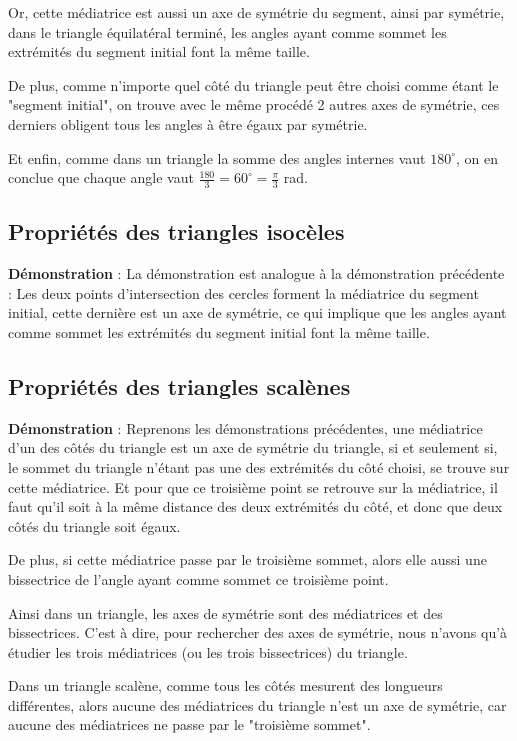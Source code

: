 \documentclass[a4paper, twoside]{article}
\begin{document}
Or, cette médiatrice est aussi un axe de symétrie du segment,
ainsi par symétrie, dans le triangle équilatéral terminé,
les angles ayant comme sommet les extrémités du segment initial font la même taille.

De plus, comme n'importe quel côté du triangle peut être choisi comme étant le "segment initial",
on trouve avec le même procédé 2 autres axes de symétrie,
ces derniers obligent tous les angles à être égaux par symétrie.

Et enfin, comme dans un triangle la somme des angles internes vaut $180^\circ$,
on en conclue que chaque angle vaut $\frac{180}{3} = 60^\circ = \frac{\pi}{3}$ rad.

\subsection*{Propriétés des triangles isocèles} \label{propriete_triangle_isocele}

\textbf{Démonstration} : La démonstration est analogue à la démonstration précédente :
Les deux points d'intersection des cercles forment la médiatrice du segment initial,
cette dernière est un axe de symétrie,
ce qui implique que les angles ayant comme sommet les extrémités du segment initial font la même taille.

\subsection*{Propriétés des triangles scalènes} \label{propriete_triangle_scalene}

\textbf{Démonstration} : Reprenons les démonstrations précédentes,
une médiatrice d'un des côtés du triangle est un axe de symétrie du triangle,
si et seulement si, le sommet du triangle n'étant pas une des extrémités du côté choisi,
se trouve sur cette médiatrice. Et pour que ce troisième point se retrouve sur la médiatrice,
il faut qu'il soit à la même distance des deux extrémités du côté,
et donc que deux côtés du triangle soit égaux.

De plus, si cette médiatrice passe par le troisième sommet,
alors elle aussi une bissectrice de l'angle ayant comme sommet ce troisième point.

Ainsi dans un triangle, les axes de symétrie sont des médiatrices et des bissectrices.
C'est à dire, pour rechercher des axes de symétrie, nous n'avons qu'à étudier les trois
médiatrices (ou les trois bissectrices) du triangle.

Dans un triangle scalène, comme tous les côtés mesurent des longueurs différentes,
alors aucune des médiatrices du triangle n'est un axe de symétrie,
car aucune des médiatrices ne passe par le "troisième sommet".
\end{document}
